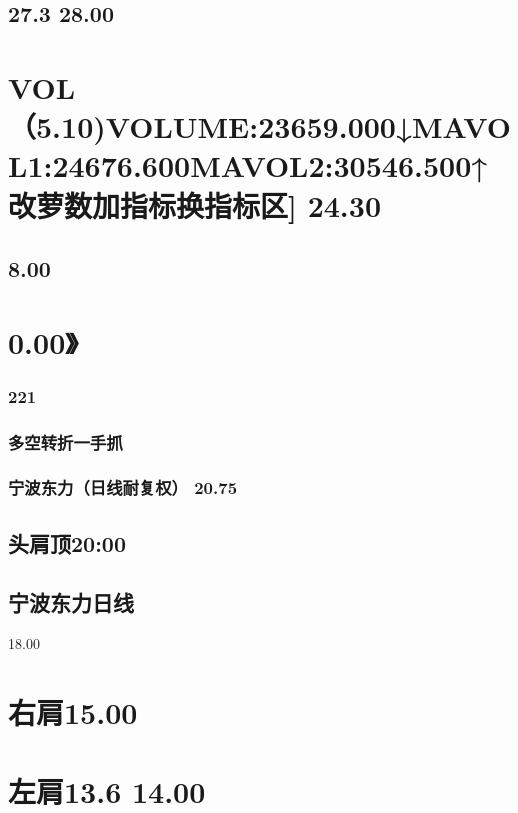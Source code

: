 \documentclass{article}
\begin{document}
\subsection{27.3 28.00}

\section{VOL（5.10)VOLUME:23659.000↓MAVOL1:24676.600MAVOL2:30546.500↑改萝数加指标换指标区] 24.30}

\subsection{8.00}

\section{0.00》}

\subsubsection{221}

\clearpage

\subsubsection{多空转折一手抓}

\subsubsection{宁波东力（日线耐复权） 20.75}

\subsection{头肩顶20:00}

\subsection{宁波东力日线}

18.00

\section{右肩15.00}

\section{左肩13.6 14.00}
\end{document}
